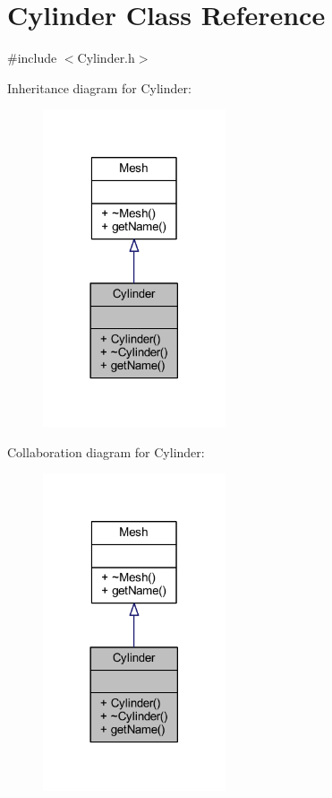 \hypertarget{class_cylinder}{}\section{Cylinder Class Reference}
\label{class_cylinder}


{\ttfamily \#include $<$Cylinder.\+h$>$}



Inheritance diagram for Cylinder\+:
\nopagebreak
\begin{figure}[H]
\begin{center}
\leavevmode
\includegraphics[width=153pt]{class_cylinder__inherit__graph}
\end{center}
\end{figure}


Collaboration diagram for Cylinder\+:
\nopagebreak
\begin{figure}[H]
\begin{center}
\leavevmode
\includegraphics[width=153pt]{class_cylinder__coll__graph}
\end{center}
\end{figure}
